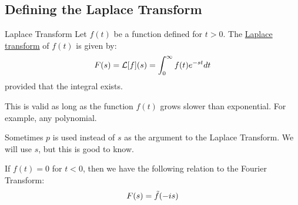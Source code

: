 \documentclass[../Main.tex]{subfiles}
\begin{document}
\subsection{Defining the Laplace Transform}
\begin{definition}{Laplace Transform}
    Let $f(t)$ be a function defined for $t > 0$. The \underline{Laplace transform} of $f(t)$ is given by:
    \begin{equation}
        F(s) = \mathcal{L}[f](s) = \int_{0}^{\infty} f(t)e^{-st} dt
        \label{eqnLaplaceTransform}
    \end{equation}
    provided that the integral exists.
\end{definition}
\begin{remarks}
    \item This is valid as long as the function $f(t)$ grows slower than exponential. For example, any polynomial.
    \item Sometimes $p$ is used instead of $s$ as the argument to the Laplace Transform. We will use $s$, but this is good to know.
    \item If $f(t) = 0$ for $t < 0$, then we have the following relation to the Fourier Transform:
        \begin{equation*}
            F(s) = \tilde{f}(-is)
        \end{equation*}
\end{remarks}
\end{document}
